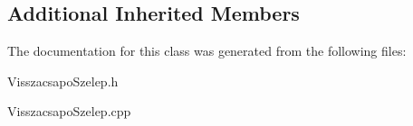 \subsection*{Additional Inherited Members}


The documentation for this class was generated from the following files\+:\begin{DoxyCompactItemize}
\item 
Visszacsapo\+Szelep.\+h\item 
Visszacsapo\+Szelep.\+cpp\end{DoxyCompactItemize}
